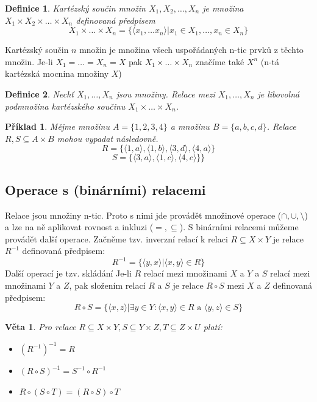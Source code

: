 \documentclass[12pt,a4paper]{article}
\newtheorem{definition}{Definice}
\newtheorem{sentence}{Věta}
\newtheorem{example}{Příklad}
\begin{document}
\begin{definition}
Kartézský součin množin $X_1, X_2, \dots,X_n$ je množina $X_1 \times X_2 \times \dots \times X_n$ definovaná předpisem $$X_1 \times \dots \times X_n =  \{\langle x_1, \dots x_n \rangle | x_1 \in X_1, \dots, x_n \in X_n\} $$
\end{definition}
 Kartézský součin $n$ množin je množina všech uspořádaných n-tic prvků z těchto množin. Je-li $X_1 = \dots = X_n = X$ pak $X_1 \times \dots \times X_n$ značíme také $X^n$ (n-tá kartézská mocnina množiny $X$)

\begin{definition}
Nechť $X_1, \dots,X_n$ jsou množiny. Relace mezi $X_1, \dots,X_n$ je libovolná podmnožina kartézského součinu $X_1 \times \dots \times X_n $.
\end{definition}

\begin{example}
Mějme množinu $A = \{1,2,3,4\}$ a množinu $B = \{a,b,c,d\}$. Relace $R,S \subseteq A \times B$ mohou vypadat následovně. $$R = \{\langle 1, a\rangle, \langle 1, b\rangle, \langle 3, d\rangle, \langle 4, a\rangle\}$$
$$S = \{\langle 3, a\rangle, \langle 1, c\rangle,  \langle 4, c\rangle\}\}$$
\end{example}

\subsection{Operace s (binárními) relacemi}
Relace jsou množiny n-tic. Proto s nimi jde provádět množinové operace ($\cap,\cup,\setminus$) a lze na ně aplikovat rovnost a inkluzi ($=, \subseteq$).
S binárními relacemi můžeme provádět další operace. Začněme tzv. inverzní relací k relaci $R \subseteq X \times Y$ je relace $R^{-1}$ definovaná předpisem: $$R^{-1} = \{\langle y, x \rangle | \langle x, y \rangle \in R\}$$
Další operací je tzv. skládání Je-li $R$ relací mezi množinami $X$ a $Y$ a $S$ relací mezi množinami $Y$ a $Z$, pak složením relací $R$ a $S$ je relace \( R \circ S \) mezi $X$ a $Z$ definovaná předpisem: $$R \circ S = \{\langle x, z \rangle | \exists y \in Y : \langle x,y\rangle \in R \text{ a } \langle y,z \rangle \in S\}$$

\begin{sentence}
	Pro relace $R \subseteq X \times Y, S \subseteq Y \times Z, T \subseteq Z \times U$ platí:
	\begin{itemize}
		\item[a)] $(R^{-1})^{-1} = R$
		\item[b)] $(R \circ S)^{-1} = S^{-1} \circ R^{-1}$
		\item[c)] $R \circ (S \circ T) = (R \circ S) \circ T$
	\end{itemize}
\end{sentence}
\end{document}
